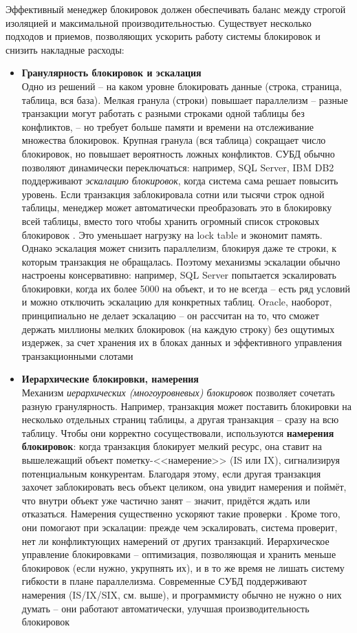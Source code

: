  Эффективный менеджер блокировок должен обеспечивать баланс между строгой изоляцией и максимальной производительностью. Существует несколько подходов и приемов, позволяющих ускорить работу системы блокировок и снизить накладные расходы: 
 \begin{itemize}
    \item \textbf{Гранулярность блокировок и эскалация} ~\\
   Одно из решений – на каком уровне блокировать данные (строка, страница, таблица, вся база). Мелкая гранула (строки) повышает параллелизм – разные транзакции могут работать с разными строками одной таблицы без конфликтов, – но требует больше памяти и времени на отслеживание множества блокировок. Крупная гранула (вся таблица) сокращает число блокировок, но повышает вероятность ложных конфликтов. СУБД обычно позволяют динамически переключаться: например, SQL Server, IBM DB2 поддерживают \textit{эскалацию блокировок}, когда система сама решает повысить уровень. Если транзакция заблокировала сотни или тысячи строк одной таблицы, менеджер может автоматически преобразовать это в блокировку всей таблицы, вместо того чтобы хранить огромный список строковых блокировок \autocite{oracleessentialsc7}. Это уменьшает нагрузку на lock table и экономит память. Однако эскалация может снизить параллелизм, блокируя даже те строки, к которым транзакция не обращалась. Поэтому механизмы эскалации обычно настроены консервативно: например, SQL Server попытается эскалировать блокировки, когда их более 5000 на объект, и то не всегда – есть ряд условий и можно отключить эскалацию для конкретных таблиц. Oracle, наоборот, принципиально не делает эскалацию – он рассчитан на то, что сможет держать миллионы мелких блокировок (на каждую строку) без ощутимых издержек, за счет хранения их в блоках данных и эффективного управления транзакционными слотами \autocite{oracleessentialsc7} 
    \item \textbf{Иерархические блокировки, намерения} ~\\
   Механизм \textit{иерархических (многоуровневых) блокировок} позволяет сочетать разную гранулярность. Например, транзакция может поставить блокировки на несколько отдельных страниц таблицы, а другая транзакция – сразу на всю таблицу. Чтобы они корректно сосуществовали, используются \textbf{намерения блокировок}: когда транзакция блокирует мелкий ресурс, она ставит на вышележащий объект пометку-<<намерение>> (IS или IX), сигнализируя потенциальным конкурентам. Благодаря этому, если другая транзакция захочет заблокировать весь объект целиком, она увидит намерения и поймёт, что внутри объект уже частично занят – значит, придётся ждать или отказаться. Намерения существенно ускоряют такие проверки \autocite{sqlhack1}. Кроме того, они помогают при эскалации: прежде чем эскалировать, система проверит, нет ли конфликтующих намерений от других транзакций. Иерархическое управление блокировками – оптимизация, позволяющая и хранить меньше блокировок (если нужно, укрупнять их), и в то же время не лишать систему гибкости в плане параллелизма. Современные СУБД поддерживают намерения (IS/IX/SIX, см. выше), и программисту обычно не нужно о них думать – они работают автоматически, улучшая производительность блокировок

\end{itemize}
